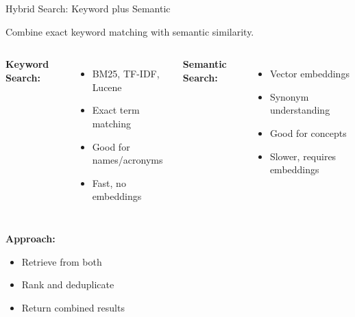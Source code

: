 \documentclass[aspectratio=169,11pt]{beamer}
\begin{document}
\begin{frame}{Hybrid Search: Keyword plus Semantic}
  \begin{conceptbox}
    Combine exact keyword matching with semantic similarity.
  \end{conceptbox}

  \begin{columns}[T]
    \textbf{Keyword Search:}
    \begin{itemize}
    \setlength{\itemsep}{1pt}
      \item BM25, TF-IDF, Lucene
      \item Exact term matching
      \item Good for names/acronyms
      \item Fast, no embeddings
    \end{itemize}

    \textbf{Semantic Search:}
    \begin{itemize}
    \setlength{\itemsep}{1pt}
      \item Vector embeddings
      \item Synonym understanding
      \item Good for concepts
      \item Slower, requires embeddings
    \end{itemize}
  \end{columns}

  \textbf{Approach:}
  \begin{itemize}
    \setlength{\itemsep}{1pt}
    \item Retrieve from both
    \item Rank and deduplicate
    \item Return combined results
  \end{itemize}
\end{frame}
\end{document}
